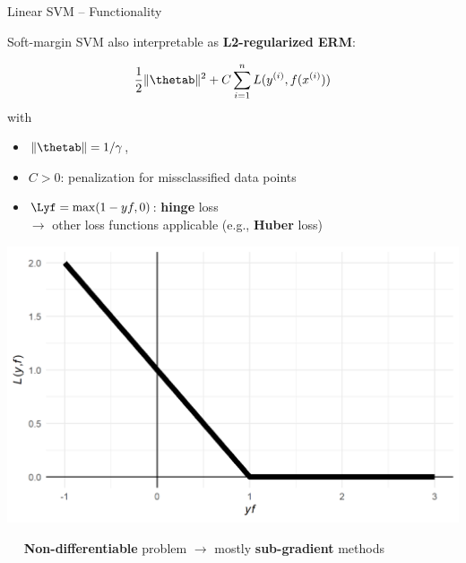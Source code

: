 \begin{vbframe}{Linear SVM -- Functionality}
\framebreak


Soft-margin SVM also interpretable as \textbf{L2-regularized ERM}: 

\begin{minipage}[c]{0.58\textwidth}
  $$ \frac{1}{2} \|\thetab\|^2 + C \sumin \Lxyi$$ 
  with  
  \begin{itemize}
    \item $\|\thetab\| = 1 / \gamma$,\\
    \item $C > 0$: penalization for missclassified data points
    \item $\Lyf = \max(1-yf, 0)$: \textbf{hinge} loss \\
    $\rightarrow$ other loss functions applicable (e.g., \textbf{Huber} loss)
  \end{itemize}
\end{minipage}
\begin{minipage}[c]{0.4\textwidth}
  \centering
  \includegraphics[height=0.4\textwidth, keepaspectratio=true]{
  figure/plot-hinge-loss.png}
\end{minipage}


%     


\vspace{1cm}

 ~~
\textbf{Non-differentiable} problem $\rightarrow$ mostly \textbf{sub-gradient} 
methods 


\end{vbframe}
